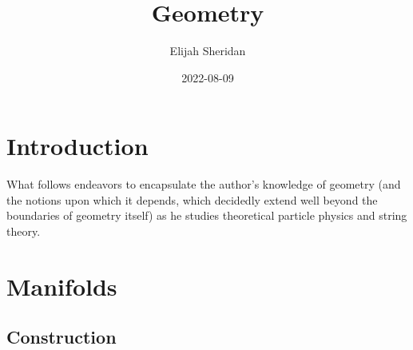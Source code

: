 \documentclass[
]{book}
\title{Geometry}
\author{Elijah Sheridan}
\date{2022-08-09}
\begin{document}
\maketitle

{
\setcounter{tocdepth}{1}
\tableofcontents
}
\hypertarget{intro}{%
\chapter{Introduction}\label{intro}}

What follows endeavors to encapsulate the author's knowledge of geometry (and the notions upon which it depends, which decidedly extend well beyond the boundaries of geometry itself) as he studies theoretical particle physics and string theory.

\hypertarget{manifolds}{%
\chapter{Manifolds}\label{manifolds}}

\hypertarget{construction}{%
\section{Construction}\label{construction}}
\end{document}
